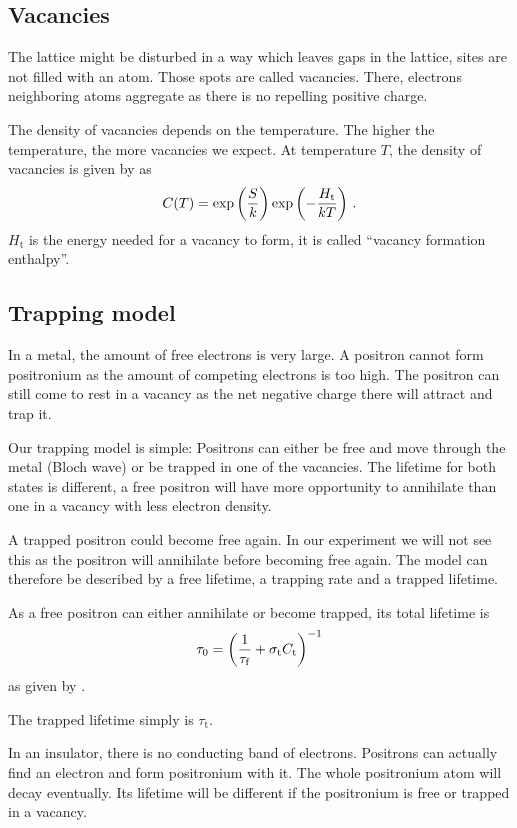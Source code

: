 \documentclass[11pt, english, fleqn, DIV=15, headinclude, BCOR=2cm]{scrreprt}
\begin{document}
\subsection{Vacancies}

The lattice might be disturbed in a way which leaves gaps in the lattice, sites
are not filled with an atom. Those spots are called vacancies. There, electrons
neighboring atoms aggregate as there is no repelling positive charge.

The density of vacancies depends on the temperature. The higher the
temperature, the more vacancies we expect. At temperature $T$, the density of
vacancies is given by \textcite[(3)]{Weiler/Vacancy_formation} as
\[
    C(T) = \exp\left( \frac{S}{k} \right) \exp\left( -\frac{H_\mathrm t}{kT} \right) \,.
\]
$H_\mathrm t$ is the energy needed for a vacancy to form, it is called
\enquote{vacancy formation enthalpy}.

\subsection{Trapping model}

In a metal, the amount of free electrons is very large. A positron cannot form
positronium as the amount of competing electrons is too high. The positron can
still come to rest in a vacancy as the net negative charge there will attract
and trap it.

Our trapping model is simple: Positrons can either be free and move through the
metal (Bloch wave) or be trapped in one of the vacancies. The lifetime for both
states is different, a free positron will have more opportunity to annihilate
than one in a vacancy with less electron density.

A trapped positron could become free again. In our experiment we will not see
this as the positron will annihilate before becoming free again. The model can
therefore be described by a free lifetime, a trapping rate and a trapped
lifetime.

As a free positron can either annihilate or become trapped, its total lifetime
is
\[
    \tau_0 = \left( \frac{1}{\tau_\mathrm f} + \sigma_\mathrm t C_\mathrm t \right)^{-1}
\]
as given by \textcite[(1a)]{Weiler/Vacancy_formation}.

The trapped lifetime simply is $\tau_\mathrm t$.

In an insulator, there is no conducting band of electrons. Positrons can
actually find an electron and form positronium with it. The whole positronium
atom will decay eventually. Its lifetime will be different if the positronium
is free or trapped in a vacancy.
\end{document}
